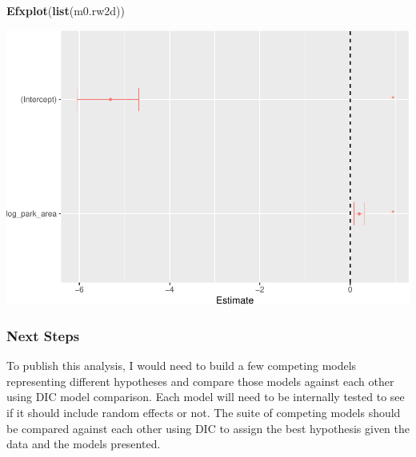 \documentclass[
]{article}
\newenvironment{Shaded}{\begin{snugshade}}{\end{snugshade}}
\newcommand{\KeywordTok}[1]{\textcolor[rgb]{0.13,0.29,0.53}{\textbf{#1}}}
\newcommand{\NormalTok}[1]{#1}
\begin{document}
\begin{Shaded}
\begin{Highlighting}[]
\KeywordTok{Efxplot}\NormalTok{(}\KeywordTok{list}\NormalTok{(m0.rw2d))}
\end{Highlighting}
\end{Shaded}

\includegraphics{Earth_Lab_application_files/figure-latex/unnamed-chunk-19-1.pdf}

\hypertarget{next-steps}{%
\subsubsection{Next Steps}\label{next-steps}}

To publish this analysis, I would need to build a few competing models
representing different hypotheses and compare those models against each
other using DIC model comparison. Each model will need to be internally
tested to see if it should include random effects or not. The suite of
competing models should be compared against each other using DIC to
assign the best hypothesis given the data and the models presented.
\end{document}
